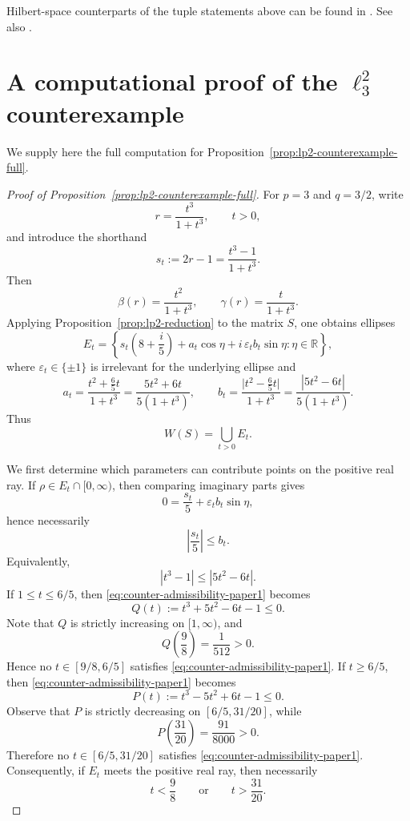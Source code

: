 \documentclass[11pt]{amsart}
\numberwithin{equation}{section}
\theoremstyle{definition}
\theoremstyle{remark}
\newcommand{\R}{\mathbb{R}}
\begin{document}
Hilbert-space counterparts of the tuple statements above can be found in
\cite{LiPoon2009, Muller2010, MT-circles, MT-jointnr}. See also \cite[Chapter~8.1]{GW}. 
\appendix

\section{A computational proof of the $\ell_3^2$ counterexample}\label{app:lp2-counterexample-proof}

We supply here the full computation for Proposition~\ref{prop:lp2-counterexample-full}.

\begin{proof}[Proof of Proposition~\ref{prop:lp2-counterexample-full}]
For $p=3$ and $q=3/2$, write
\[
r=\frac{t^3}{1+t^3},\qquad t>0,
\]
and introduce the shorthand
\[
s_t:=2r-1=\frac{t^3-1}{1+t^3}.
\]
Then
\[
\beta(r)=\frac{t^2}{1+t^3},
\qquad
\gamma(r)=\frac{t}{1+t^3}.
\]
Applying Proposition~\ref{prop:lp2-reduction} to the matrix $S$, one obtains ellipses
\[
E_t=
\left\{
 s_t\!\left(8+\frac{i}{5}\right)+a_t\cos\eta+i\,\varepsilon_t b_t\sin\eta:
 \eta\in\R
\right\},
\]
where $\varepsilon_t\in\{\pm1\}$ is irrelevant for the underlying ellipse and
\[
a_t=\frac{t^2+\frac65 t}{1+t^3}=\frac{5t^2+6t}{5(1+t^3)},
\qquad
b_t=\frac{\bigl|t^2-\frac65 t\bigr|}{1+t^3}=\frac{|5t^2-6t|}{5(1+t^3)}.
\]
Thus
\[
W(S)=\bigcup_{t>0} E_t.
\]

We first determine which parameters can contribute points on the positive real ray.
If $\rho\in E_t\cap[0,\infty)$, then comparing imaginary parts gives
\[
0=\frac{s_t}{5}+\varepsilon_t b_t\sin\eta,
\]
hence necessarily
\[
\left|\frac{s_t}{5}\right|\le b_t.
\]
Equivalently,
\begin{equation}\label{eq:counter-admissibility-paper1}
|t^3-1|\le |5t^2-6t|.
\end{equation}
If $1\le t\le 6/5$, then \eqref{eq:counter-admissibility-paper1} becomes
\[
Q(t):=t^3+5t^2-6t-1\le 0.
\]
Note that
$Q$ is strictly increasing on $[1,\infty)$, and
\[
Q\!\left(\frac98\right)=\frac1{512}>0.
\]
Hence no $t\in[9/8,6/5]$ satisfies \eqref{eq:counter-admissibility-paper1}.
If $t\ge 6/5$, then \eqref{eq:counter-admissibility-paper1} becomes
\[
P(t):=t^3-5t^2+6t-1\le 0.
\]
Observe that
$P$ is strictly decreasing on $[6/5,31/20]$, while
\[
P\!\left(\frac{31}{20}\right)=\frac{91}{8000}>0.
\]
Therefore no $t\in[6/5,31/20]$ satisfies \eqref{eq:counter-admissibility-paper1}. Consequently, if $E_t$ meets the positive real ray, then necessarily
\begin{equation}\label{eq:counter-gap-in-t-paper1}
t<\frac98
\qquad\text{or}\qquad
t>\frac{31}{20}.
\end{equation}


\end{proof}
\end{document}
